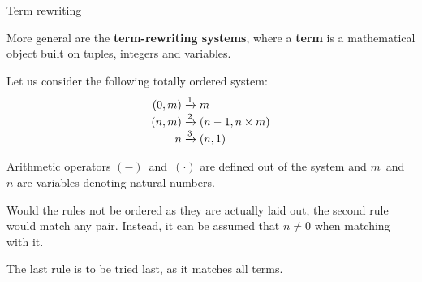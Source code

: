 \documentclass[compress,dvipdfmx]{beamer}
\begin{document}
%
\begin{frame}{Term rewriting}

  More general are the \textbf{term\hyp{}rewriting systems}, where a
  \textbf{term} is a mathematical object built on tuples, integers and
  variables.

  \bigskip

   Let us consider the following totally ordered system:
   \begin{align*}
     (0,m) &\xrightarrow{1} m\\
     (n,m) &\xrightarrow{\smash 2} (n-1, n \times m)\\
     n     &\xrightarrow{\smash 3} (n,1)
   \end{align*}

   Arithmetic operators \((-)\)~and~\((\cdot)\) are defined out of the
   system and \(m\)~and~\(n\) are variables denoting natural numbers.

   \bigskip

   Would the rules not be ordered as they are actually laid out, the
   second rule would match any pair. Instead, it can be assumed that
   \(n \neq 0\) when matching with it.

   \bigskip

   The last rule is to be tried last, as it matches all terms.

\end{frame}
\end{document}
